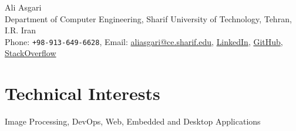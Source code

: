 \documentclass[10pt, a4paper]{article}
\begin{document}
{\LARGE Ali Asgari}\\[1cm]
Department of Computer Engineering, Sharif University of Technology, Tehran, I.R. Iran\\[.2cm]
Phone: \texttt{+98-913-649-6628}, Email: \href{mailto:aliasgari@ce.sharif.edu}{aliasgari@ce.sharif.edu},  \href{https://www.linkedin.com/in/ali-asgari-51981884/}{LinkedIn}, \href{https://github.com/altostratous}{GitHub}, \href{https://stackoverflow.com/users/2656621/ali-asgari?tab=profile}{StackOverflow}\\ 


\section*{Technical Interests}
Image Processing, DevOps, Web, Embedded and Desktop Applications
\end{document}
